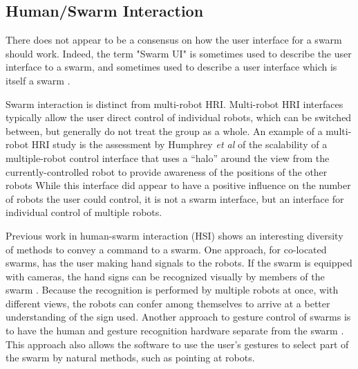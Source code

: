 \subsection{Human/Swarm Interaction} \label{section:Existing_Research_on_Swarm_Controlability}

There does not appear to be a consensus on how the user interface for a swarm should work.
Indeed, the term "Swarm UI" is sometimes used to describe the user interface to a swarm, and sometimes used to describe a user interface which is itself a swarm \citep{le2016zooids, suzuki2018reactile}.

Swarm interaction is distinct from multi-robot HRI. 
Multi-robot HRI interfaces typically allow the user direct control of individual robots, which can be switched between, but generally do not treat the group as a whole. 
An example of a multi-robot HRI study is the assessment by Humphrey \emph{et al} of the scalability of a multiple-robot control interface that uses a ``halo'' around the view from the currently-controlled robot to provide awareness of the positions of the other robots \citep{humphrey2007assessing}
While this interface did appear to have a positive influence on the number of robots the user could control, it is not a swarm interface, but an interface for individual control of multiple robots. 

Previous work in human-swarm interaction (HSI) shows an interesting diversity of methods to convey a command to a swarm. 
One approach, for co-located swarms, has the user making hand signals to the robots. 
If the swarm is equipped with cameras, the hand signs can be recognized visually by members of the swarm \citep{nagi2014online, giusti2012human, nagi2014human}. 
Because the recognition is performed by multiple robots at once, with different views, the robots can confer among themselves to arrive at a better understanding of the sign used.
Another approach to gesture control of swarms is to have the human and gesture recognition hardware separate from the swarm \citep{alonso2015gesture}.
This approach also allows the software to use the user's gestures to select part of the swarm by natural methods, such as pointing at robots. 

